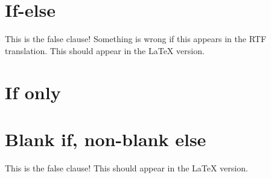 ﻿\documentclass[11pt]{report}
\newif\iflatextortf  %
\begin{document}
\section{If-else}

\iflatextortf
  This is the true clause!  There should be no false clause.
\else
  This is the false clause!  Something is wrong if this appears in the RTF translation.
  This should appear in the \LaTeX{} version.
\fi

\section{If only}

\iflatextortf
  This is the true clause, with no else clause. It should not appear in the \LaTeX{} version.
\fi

\section{Blank if, non-blank else}

\iflatextortf
\else
  This is the false clause!
  This should appear in the \LaTeX{} version.
\fi

%
%


\end{document}
